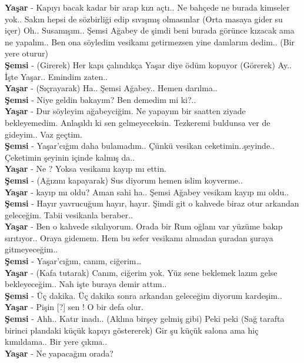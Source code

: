 \documentclass[]{book}
\begin{document}
\textbf{Yaşar} - Kapıyı bacak kadar bir arap kızı açtı.. Ne bahçede ne burada kimseler yok.. Sakın hepsi de sözbirliği edip sıvışmış olmasınlar (Orta masaya gider su içer) Oh.. Susamışım.. Şemsi Ağabey de şimdi beni burada görünce kızacak ama ne yapalım.. Ben ona söyledim vesikamı getirmezsen yine damlarım dedim.. (Bir yere oturur)\\
\textbf{Şemsi} - (Girerek) Her kapı çalındıkça Yaşar diye ödüm kopuyor (Görerek) Ay.. İşte Yaşar.. Emindim zaten..\\
\textbf{Yaşar} - (Sıçrayarak) Ha.. Şemsi Ağabey.. Hemen darılma..\\
\textbf{Şemsi} - Niye geldin bakayım? Ben demedim mi ki?..\\
\textbf{Yaşar} - Dur söyleyim ağabeyciğim. Ne yapayım bir saatten ziyade bekleyemedim. Anlaşıldı ki sen gelmeyeceksin. Tezkeremi buldunsa ver de gideyim.. Vaz geçtim.\\
\textbf{Şemsi} - Yaşar'cığım daha bulamadım.. Çünkü vesikan ceketimin..şeyinde.. Çeketimin şeyinin içinde kalmış da..\\
\textbf{Yaşar} - Ne ? Yoksa vesikamı kayıp mı ettin.\\
\textbf{Şemsi} - (Ağızını kapayarak) Sus diyorum hemen islim koyverme..\\
\textbf{Yaşar} - kayıp mı oldu? Aman sahi ha.. Şemsi Ağabey vesikam kayıp mı oldu..\\
\textbf{Şemsi} - Hayır yavrucuğum hayır, hayır. Şimdi git o kahvede biraz otur arkandan geleceğim. Tabii vesikanla beraber..\\
\textbf{Yaşar} - Ben o kahvede sıkılıyorum. Orada bir Rum oğlanı var yüzüme bakıp sırıtıyor.. Oraya gidemem. Hem bu sefer vesikamı almadan şuradan şuraya gitmeyeceğim..\\
\textbf{Şemsi} - Yaşar'cığım, canım, ciğerim\ldots{}\\
\textbf{Yaşar} - (Kafa tutarak) Canım, ciğerim yok. Yüz sene beklemek lazım gelse bekleyeceğim.. Nah işte buraya demir attım..\\
\textbf{Şemsi} - Üç dakika. Üç dakika sonra arkandan geleceğim diyorum kardeşim..\\
\textbf{Yaşar} - Pişin {[}?{]} sen ! O bir defa olur.\\
\textbf{Şemsi} - Ahh.. Katır inadı.. (Aklına birşey gelmiş gibi) Peki peki (Sağ tarafta birinci plandaki küçük kapıyı göstererek) Gir şu küçük salona ama hiç kımıldama.. Bir yere çıkma..\\
\textbf{Yaşar} - Ne yapacağım orada?\\
\end{document}
